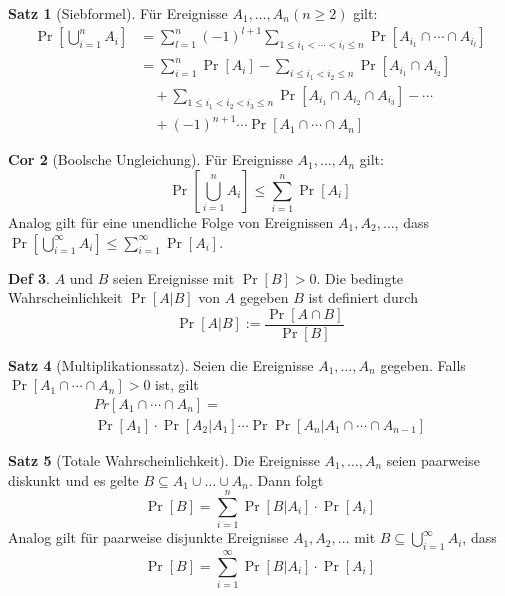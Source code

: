 \documentclass[a4paper, 10pt]{article}
\theoremstyle{definition}
\newtheorem{definition}{Def}[section]
\newtheorem{theorem}[definition]{Satz}
\newtheorem{ncorollary}[definition]{Cor}
\theoremstyle{named}
\begin{document}
\setcounter{definition}{4}
\begin{theorem}[Siebformel]
    Für Ereignisse $A_1, \ldots , A_n (n \geq 2)$ gilt:
    \begin{align*}
        \Pr\left[\bigcup_{i = 1}^n A_i\right] &= \sum_{l=1}^n (-1)^{l+1} \sum_{1 \leq i_1 < \cdots < i_l \leq n} \Pr[A_{i_1} \cap \cdots \cap A_{i_l}] \\
        &= \sum_{i = 1}^n \Pr[A_i] - \sum_{i \leq i_1 < i_2 \leq n} \Pr[A_{i_1} \cap A_{i_2}] \\
        & \quad + \sum_{1 \leq i_1 < i_2 < i_3 \leq n} \Pr[A_{i_1} \cap A_{i_2} \cap A_{i_3}] - \cdots \\
        & \quad + (-1)^{n+1} \cdots \Pr[A_1 \cap \cdots \cap A_n]
    \end{align*}
\end{theorem}

\begin{ncorollary}[Boolsche Ungleichung]
    Für Ereignisse $A_1, \ldots, A_n$ gilt:
    $$\Pr\left[\bigcup_{i=1}^n A_i\right] \leq \sum_{i=1}^n  \Pr[A_i]$$
    Analog gilt für eine unendliche Folge von Ereignissen $A_1, A_2, \ldots$, dass $\Pr[\bigcup_{i=1}^\infty A_i] \leq \sum_{i=1}^\infty \Pr[A_i]$.
\end{ncorollary}

\setcounter{definition}{7}
\begin{definition}
    $A$ und $B$ seien Ereignisse mit $\Pr[B] > 0$. Die bedingte Wahrscheinlichkeit $\Pr[A|B]$ von $A$ gegeben $B$ ist definiert durch
    $$\Pr[A|B] := \frac{\Pr[A \cap B]}{\Pr[B]}$$
\end{definition}

\setcounter{definition}{9}
\begin{theorem}[Multiplikationssatz]
    Seien die Ereignisse $A_1, \ldots, A_n$ gegeben. Falls $\Pr[A_1 \cap \cdots \cap A_n] > 0$ ist, gilt
    \begin{multline*}
        Pr[A_1 \cap \cdots \cap A_n] = \\
        \Pr[A_1] \cdot \Pr[A_2 | A_1] \cdots \Pr \Pr[A_n | A_1 \cap \cdots \cap A_{n - 1}]
    \end{multline*}
\end{theorem}

\setcounter{definition}{12}
\begin{theorem}[Totale Wahrscheinlichkeit]
    Die Ereignisse $A_1, \ldots, A_n$ seien paarweise diskunkt und es gelte $B \subseteq A_1 \cup \ldots \cup A_n$. Dann folgt
    $$\Pr[B] = \sum_{i = 1}^n \Pr[B | A_i] \cdot \Pr[A_i]$$
    Analog gilt für paarweise disjunkte Ereignisse $A_1, A_2, \ldots$ mit $B \subseteq \bigcup_{i = 1}^\infty A_i$, dass
    $$\Pr[B] = \sum_{i = 1}^\infty \Pr[B | A_i] \cdot \Pr[A_i]$$
\end{theorem}
\end{document}
